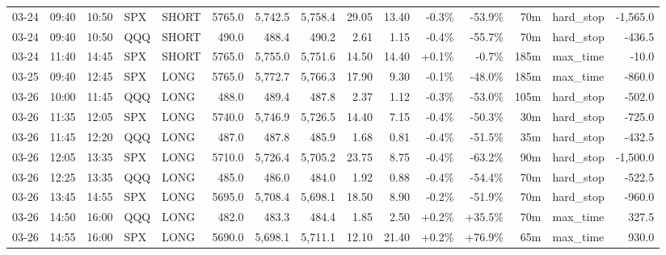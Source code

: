 \documentclass[11pt,a4paper,twoside]{article}
\begin{document}
\begin{landscape}
\begin{center}
\begin{longtable}{>{\color{txtmain}}l l l l l r r r r r r r r >{\color{txtmain}}l r}
03-24 & 09:40 & 10:50 & SPX & SHORT & 5765.0 & 5,742.5 & 5,758.4 & 29.05 & 13.40 & \textcolor{lossred}{-0.3\%} & \textcolor{lossred}{-53.9\%} & 70m & hard\_stop & \textcolor{lossred}{-1,565.0} \\
03-24 & 09:40 & 10:50 & QQQ & SHORT & 490.0 & 488.4 & 490.2 & 2.61 & 1.15 & \textcolor{lossred}{-0.4\%} & \textcolor{lossred}{-55.7\%} & 70m & hard\_stop & \textcolor{lossred}{-436.5} \\
03-24 & 11:40 & 14:45 & SPX & SHORT & 5765.0 & 5,755.0 & 5,751.6 & 14.50 & 14.40 & \textcolor{wingreen}{+0.1\%} & \textcolor{lossred}{-0.7\%} & 185m & max\_time & \textcolor{lossred}{-10.0} \\
03-25 & 09:40 & 12:45 & SPX & LONG & 5765.0 & 5,772.7 & 5,766.3 & 17.90 & 9.30 & \textcolor{lossred}{-0.1\%} & \textcolor{lossred}{-48.0\%} & 185m & max\_time & \textcolor{lossred}{-860.0} \\
03-26 & 10:00 & 11:45 & QQQ & LONG & 488.0 & 489.4 & 487.8 & 2.37 & 1.12 & \textcolor{lossred}{-0.3\%} & \textcolor{lossred}{-53.0\%} & 105m & hard\_stop & \textcolor{lossred}{-502.0} \\
03-26 & 11:35 & 12:05 & SPX & LONG & 5740.0 & 5,746.9 & 5,726.5 & 14.40 & 7.15 & \textcolor{lossred}{-0.4\%} & \textcolor{lossred}{-50.3\%} & 30m & hard\_stop & \textcolor{lossred}{-725.0} \\
03-26 & 11:45 & 12:20 & QQQ & LONG & 487.0 & 487.8 & 485.9 & 1.68 & 0.81 & \textcolor{lossred}{-0.4\%} & \textcolor{lossred}{-51.5\%} & 35m & hard\_stop & \textcolor{lossred}{-432.5} \\
03-26 & 12:05 & 13:35 & SPX & LONG & 5710.0 & 5,726.4 & 5,705.2 & 23.75 & 8.75 & \textcolor{lossred}{-0.4\%} & \textcolor{lossred}{-63.2\%} & 90m & hard\_stop & \textcolor{lossred}{-1,500.0} \\
03-26 & 12:25 & 13:35 & QQQ & LONG & 485.0 & 486.0 & 484.0 & 1.92 & 0.88 & \textcolor{lossred}{-0.4\%} & \textcolor{lossred}{-54.4\%} & 70m & hard\_stop & \textcolor{lossred}{-522.5} \\
03-26 & 13:45 & 14:55 & SPX & LONG & 5695.0 & 5,708.4 & 5,698.1 & 18.50 & 8.90 & \textcolor{lossred}{-0.2\%} & \textcolor{lossred}{-51.9\%} & 70m & hard\_stop & \textcolor{lossred}{-960.0} \\
03-26 & 14:50 & 16:00 & QQQ & LONG & 482.0 & 483.3 & 484.4 & 1.85 & 2.50 & \textcolor{wingreen}{+0.2\%} & \textcolor{wingreen}{+35.5\%} & 70m & max\_time & \textcolor{wingreen}{327.5} \\
03-26 & 14:55 & 16:00 & SPX & LONG & 5690.0 & 5,698.1 & 5,711.1 & 12.10 & 21.40 & \textcolor{wingreen}{+0.2\%} & \textcolor{wingreen}{+76.9\%} & 65m & max\_time & \textcolor{wingreen}{930.0} \\

\end{longtable}
\end{center}
\end{landscape}
\end{document}
